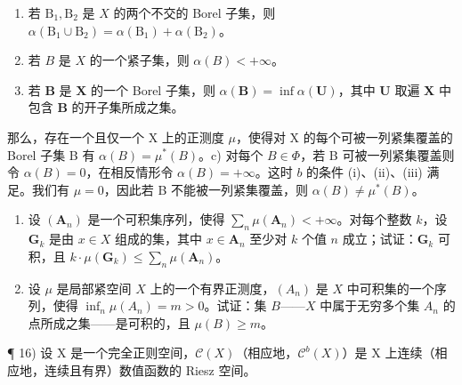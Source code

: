 \begin{enumerate}
\def\labelenumi{(\roman{enumi})}
\item
  若 \(\mathrm{B}_1, \mathrm{B}_2\) 是 \(X\) 的两个不交的 Borel 子集，则 \(\alpha(\mathrm{B}_1 \cup \mathrm{B}_2) = \alpha(\mathrm{B}_1) + \alpha(\mathrm{B}_2)\)。\\
\item
  若 \(B\) 是 \(X\) 的一个紧子集，则 \(\alpha(B) < +\infty\)。
\item
  若 \(\mathbf{B}\) 是 \(\mathbf{X}\) 的一个 Borel 子集，则 \(\alpha(\mathbf{B}) = \inf \alpha(\mathbf{U})\)，其中 \(\mathbf{U}\) 取遍 \(\mathbf{X}\) 中包含 \(\mathbf{B}\) 的开子集所成之集。
\end{enumerate}

那么，存在一个且仅一个 X 上的正测度 \(\mu\)，使得对 X 的每个可被一列紧集覆盖的 Borel 子集 B 有 \(\alpha(B) = \mu^{*}(B)\)。c) 对每个 \(B \in \Phi\)，若 B 可被一列紧集覆盖则令 \(\alpha(B) = 0\)，在相反情形令 \(\alpha(B) = +\infty\)。这时 \(b\) 的条件 (i)、(ii)、(iii) 满足。我们有 \(\mu = 0\)，因此若 B 不能被一列紧集覆盖，则 \(\alpha(B) \neq \mu^{*}(B)\)。

\begin{enumerate}
\def\labelenumi{\arabic{enumi})}
\setcounter{enumi}{13}
\item
  设 \((\mathbf{A}_n)\) 是一个可积集序列，使得 \(\sum_{n} \mu(\mathbf{A}_n) < +\infty\)。对每个整数 \(k\)，设 \(\mathbf{G}_k\) 是由 \(x \in X\) 组成的集，其中 \(x \in \mathbf{A}_n\) 至少对 \(k\) 个值 \(n\) 成立；试证：\(\mathbf{G}_k\) 可积，且 \(k \cdot \mu(\mathbf{G}_k) \leqslant \sum_{n} \mu(\mathbf{A}_n)\)。
\item
  设 \(\mu\) 是局部紧空间 \(X\) 上的一个有界正测度，\((A_n)\) 是 \(X\) 中可积集的一个序列，使得 \(\inf_{n} \mu(A_n) = m > 0\)。试证：集 \(B\)——\(X\) 中属于无穷多个集 \(A_n\) 的点所成之集——是可积的，且 \(\mu(B) \geqslant m\)。
\end{enumerate}

¶ 16) 设 X 是一个完全正则空间，\(\mathcal{C}(X)\)（相应地，\(\mathcal{C}^b(X)\)）是 X 上连续（相应地，连续且有界）数值函数的 Riesz 空间。

